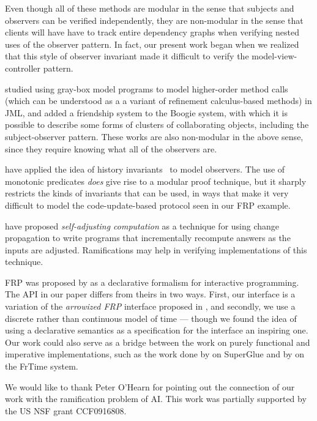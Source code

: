 \documentclass[preprint,natbib]{sigplanconf}
\begin{document}
Even though all of these methods are modular in the sense that
subjects and observers can be verified independently, they are
non-modular in the sense that clients will have have to track entire
dependency graphs when verifying nested uses of the observer
pattern. In fact, our present work began when we realized that this
style of observer invariant made it difficult to verify the
model-view-controller pattern.

\citet{shaner-leavens-naumann} studied using gray-box model programs
to model higher-order method calls (which can be understood as a a
variant of refinement calculus-based methods) in JML, and
\citet{barnett-naumann} added a friendship system to the Boogie
system, with which it is possible to describe some forms of clusters of
collaborating objects, including the subject-observer pattern. 
These works are also
non-modular in the above sense, since they require 
knowing what all of the observers are.


\citet{history-invariants} have applied the idea of
history invariants~\cite{liskov-wing} to model observers. The use of
monotonic predicates \emph{does} give rise to a modular
proof technique, but it sharply restricts the kinds of invariants that
can be used, in ways that make it very difficult to model the
code-update-based protocol seen in our FRP example. 

\citet{self-adjusting} have proposed \emph{self-adjusting computation}
as a technique for using change propagation to write programs that
incrementally recompute answers as the inputs are
adjusted. Ramifications may help in verifying implementations of
this technique.

FRP was proposed by \citet{frp} as a declarative formalism for
interactive programming. The API in our paper differs from theirs in
two ways. First, our interface is a variation of the \emph{arrowized
  FRP} interface proposed in \citet{afrp}, and secondly, we use a
discrete rather than continuous model of time --- though we found the
idea of using a declarative semantics as a specification for the
interface an inspiring one.  Our work could also serve as a bridge
between the work on purely functional and imperative implementations,
such as the work done by \citet{superglue} on SuperGlue and by
\citet{frtime} on the FrTime system.

\acks We would like to thank Peter O'Hearn for pointing out the connection
of our work with the ramification problem of AI. This work was
partially supported by the US NSF grant CCF0916808.
\end{document}
